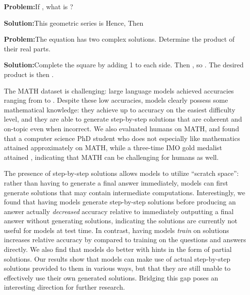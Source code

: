 \documentclass{article}
\begin{document}
\begin{figure*}[ht]
\begin{minipage}{0.48\textwidth}
\begin{flushleft}
\textbf{Problem:}\quad If , what is ?

\textbf{Solution:}\quad This geometric series is  Hence,   Then 

\textbf{Problem:}\quad The equation  has two complex solutions. Determine the product of their real parts.

\textbf{Solution:}\quad Complete the square by adding 1 to each side. Then , so . The desired product is then .



\end{flushleft}
\end{minipage}

\caption{Previous work is based on formal theorem provers or straightforward plug-and-chug problems. Our dataset, MATH, has competition mathematics problems with step-by-step solutions written in \LaTeX{} and natural language. Models are tasked with generating tokens to construct the final (boxed) answer.}
\label{fig:splash}
\vspace{-10pt}
\end{figure*}




The MATH dataset is challenging: large language models achieved 
accuracies ranging from  to . Despite these low accuracies, models clearly possess some 
mathematical knowledge: they achieve up to  accuracy on the easiest difficulty level, and they are able to generate step-by-step solutions that are coherent and on-topic even when incorrect. We also evaluated humans on MATH, and found that a computer science PhD student who does not especially like mathematics attained approximately  on MATH, while a three-time IMO gold medalist attained , indicating that MATH can be challenging for humans as well. 

The presence of step-by-step solutions allows models to utilize ``scratch space'': rather than having to generate 
a final answer immediately, models can first generate solutions that may contain intermediate computations. Interestingly, we found that having models generate step-by-step solutions before producing an answer actually \emph{decreased} accuracy relative to immediately outputting a final answer without generating solutions, indicating the solutions are currently not useful for models at test time. In contrast, having models \emph{train} on solutions increases relative accuracy by  compared to training on the questions and answers directly. We also find that models do better with hints in the form of partial solutions. Our results show that models can make use of actual step-by-step solutions provided to them in various ways, but that they are still unable to effectively use their own generated solutions. Bridging this gap poses an interesting direction for further research.
\end{document}
